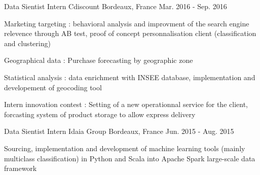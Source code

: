 \begin{cventries}
  \cventry
    {Data Sientist Intern} %
    {Cdiscount} %
    {Bordeaux, France} %
    {Mar. 2016 - Sep. 2016} %
    {
      \begin{cvitems} %
        \item {Marketing targeting : behavioral analysis and improvment of the search engine relevence through AB test, proof of concept personnalisation client (classification and clustering)}
        \item {Geographical data : Purchase forecasting by geographic zone}
        \item {Statistical analysis : data enrichment with INSEE database, implementation and developement of geocoding tool}
        \item {Intern innovation contest : Setting of a new operationnal service for the client, forcasting system of product storage to allow express delivery}
      \end{cvitems}
    }

  \cventry
    {Data Sientist Intern} %
    {Idaia Group} %
    {Bordeaux, France} %
    {Jun. 2015 - Aug. 2015} %
    {
      \begin{cvitems} %
        \item {Sourcing, implementation and development of machine learning tools (mainly multiclass classification) in Python and Scala into Apache Spark large-scale data framework}
      \end{cvitems}
    }
    
\end{cventries}
